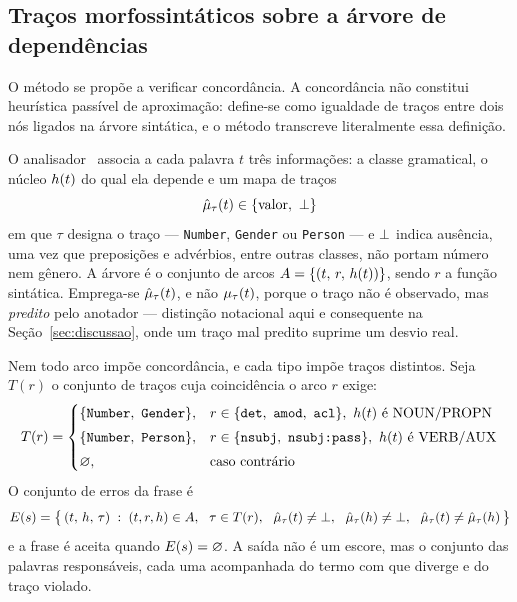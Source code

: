 \subsection{Traços morfossintáticos sobre a árvore de dependências}
\label{met:tracos}

\indent\indent O método se propõe a verificar concordância. A concordância não constitui heurística passível
de aproximação: define-se como igualdade de traços entre dois nós ligados na árvore sintática,
e o método transcreve literalmente essa definição.

O analisador~\cite{nivre2016} associa a cada palavra $t$ três informações: a classe gramatical,
o núcleo $h(t)$ do qual ela depende e um mapa de traços
%
\begin{equation}
\hat\mu_{\tau}(t) \in \{\text{valor},\ \bot\}
\label{eq:tracos-mapa}
\end{equation}
%
em que $\tau$ designa o traço --- \texttt{Number}, \texttt{Gender} ou \texttt{Person} --- e
$\bot$ indica ausência, uma vez que preposições e advérbios, entre outras classes, não
portam número nem gênero. A árvore é o conjunto de arcos $A = \{(t,\, r,\, h(t))\}$,
sendo $r$ a função sintática. Emprega-se $\hat\mu_{\tau}(t)$, e não $\mu_{\tau}(t)$, porque
o traço não é observado, mas \emph{predito} pelo anotador --- distinção notacional aqui e
consequente na Seção~\ref{sec:discussao}, onde um traço mal predito suprime um desvio real.

Nem todo arco impõe concordância, e cada tipo impõe traços distintos. Seja $T(r)$ o conjunto
de traços cuja coincidência o arco $r$ exige:
%
\begin{equation}
T(r) = \begin{cases}
\{\texttt{Number},\ \texttt{Gender}\}, & r \in \{\texttt{det},\ \texttt{amod},\ \texttt{acl}\},\ \nucleo{t} \text{ é NOUN/PROPN} \\[3pt]
\{\texttt{Number},\ \texttt{Person}\}, & r \in \{\texttt{nsubj},\ \texttt{nsubj:pass}\},\ \nucleo{t} \text{ é VERB/AUX} \\[3pt]
\varnothing, & \text{caso contrário}
\end{cases}
\label{eq:tracos-Tr}
\end{equation}
%
O conjunto de erros da frase é
%
\begin{equation}
E(s) = \bigl\{\, (t,\,h,\,\tau) \;:\; (t,r,h) \in A,\ \ \tau \in T(r),\ \
\hat\mu_{\tau}(t) \neq \bot,\ \ \hat\mu_{\tau}(h) \neq \bot,\ \
\hat\mu_{\tau}(t) \neq \hat\mu_{\tau}(h) \,\bigr\}
\label{eq:tracos-E}
\end{equation}
%
e a frase é aceita quando $E(s) = \varnothing$. A saída não é um escore, mas o conjunto das
palavras responsáveis, cada uma acompanhada do termo com que diverge e do traço violado.


